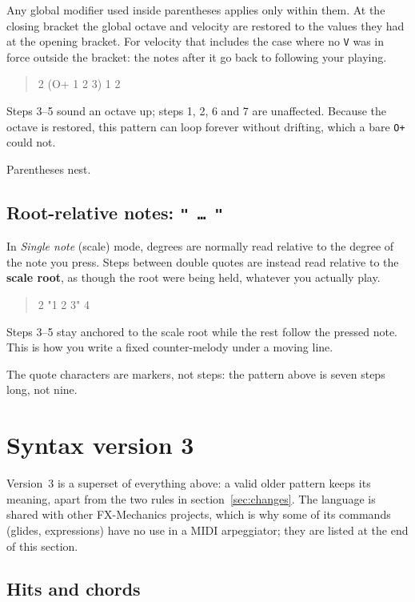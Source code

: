 \documentclass[11pt,a4paper]{article}
\newcommand{\pat}[1]{\texttt{#1}}
\newenvironment{patternblock}
  {\begin{quote}\ttfamily\noindent}
  {\end{quote}}
\begin{document}
Any global modifier used inside parentheses applies only within them. At the
closing bracket the global octave and velocity are restored to the values they
had at the opening bracket. For velocity that includes the case where no
\pat{V} was in force outside the bracket: the notes after it go back to
following your playing.

\begin{patternblock}
1 2 (O+ 1 2 3) 1 2
\end{patternblock}
\noindent
Steps 3--5 sound an octave up; steps 1, 2, 6 and 7 are unaffected. Because the
octave is restored, this pattern can loop forever without drifting, which a
bare \pat{O+} could not.

Parentheses nest.

\subsection{Root-relative notes: \texttt{" \ldots\ "}}

In \emph{Single note} (scale) mode, degrees are normally read relative to the
degree of the note you press. Steps between double quotes are instead read
relative to the \textbf{scale root}, as though the root were being held,
whatever you actually play.

\begin{patternblock}
1 2 "1 2 3" 4
\end{patternblock}
\noindent
Steps 3--5 stay anchored to the scale root while the rest follow the pressed
note. This is how you write a fixed counter-melody under a moving line.

The quote characters are markers, not steps: the pattern above is seven steps
long, not nine.

\section{Syntax version 3}
\label{sec:syntax3}

Version~3 is a superset of everything above: a valid older pattern keeps its
meaning, apart from the two rules in section~\ref{sec:changes}. The language is
shared with other FX-Mechanics projects, which is why some of its commands
(glides, expressions) have no use in a MIDI arpeggiator; they are listed at the
end of this section.

\subsection{Hits and chords}
\end{document}
